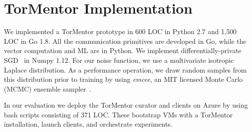 \chapter{TorMentor Implementation}
\label{sec:impl}

We implemented a TorMentor prototype in 600 LOC in Python 2.7 and
1,500 LOC in Go 1.8. All the communication primitives are developed in
Go, while the vector computation and ML are in Python. We implement
differentially-private SGD~\cite{Song:2013} in Numpy 1.12. For our
noise function, we use a multivariate isotropic Laplace distribution.
As a performance operation, we draw random samples from this
distribution prior to training by using \emph{emcee}, an MIT licensed
Monte Carlo (MCMC) ensemble sampler~\cite{mcmc:2013}.

In our evaluation we deploy the TorMentor curator and clients on
Azure by using bash scripts consisting of 371 LOC. These bootstrap VMs
with a TorMentor installation, launch clients, and orchestrate experiments.

